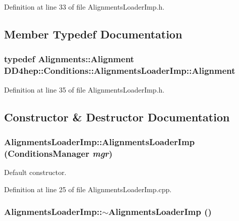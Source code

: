 Definition at line 33 of file AlignmentsLoaderImp.h.

\subsection{Member Typedef Documentation}
\hypertarget{class_d_d4hep_1_1_conditions_1_1_alignments_loader_imp_a2af19e971736ac6856523194f7eb717a}{
\subsubsection[{Alignment}]{\setlength{\rightskip}{0pt plus 5cm}typedef {\bf Alignments::Alignment} {\bf DD4hep::Conditions::AlignmentsLoaderImp::Alignment}}}
\label{class_d_d4hep_1_1_conditions_1_1_alignments_loader_imp_a2af19e971736ac6856523194f7eb717a}


Definition at line 35 of file AlignmentsLoaderImp.h.

\subsection{Constructor \& Destructor Documentation}
\hypertarget{class_d_d4hep_1_1_conditions_1_1_alignments_loader_imp_a82c0f304132e15093e9e2a7a74e33f00}{
\subsubsection[{AlignmentsLoaderImp}]{\setlength{\rightskip}{0pt plus 5cm}AlignmentsLoaderImp::AlignmentsLoaderImp ({\bf ConditionsManager} {\em mgr})}}
\label{class_d_d4hep_1_1_conditions_1_1_alignments_loader_imp_a82c0f304132e15093e9e2a7a74e33f00}


Default constructor. 

Definition at line 25 of file AlignmentsLoaderImp.cpp.\hypertarget{class_d_d4hep_1_1_conditions_1_1_alignments_loader_imp_a6d54425e5976b7e45f5e99722fcbbbff}{
\subsubsection[{$\sim$AlignmentsLoaderImp}]{\setlength{\rightskip}{0pt plus 5cm}AlignmentsLoaderImp::$\sim$AlignmentsLoaderImp ()}}
\label{class_d_d4hep_1_1_conditions_1_1_alignments_loader_imp_a6d54425e5976b7e45f5e99722fcbbbff}


